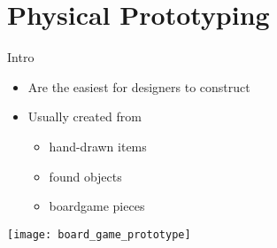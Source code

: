 \part{Physical Prototyping}
\frame{\partpage}

\begin{frame}{Intro}
	\begin{itemize}
		\item Are the easiest for designers to construct
		\item Usually created from 
		\begin{itemize}
			\item hand-drawn items
			\item found objects
			\item boardgame pieces
		\end{itemize}
	\end{itemize}
\end{frame}

\begin{frame}
	\texttt{[image: board\_game\_prototype]}
\end{frame}
